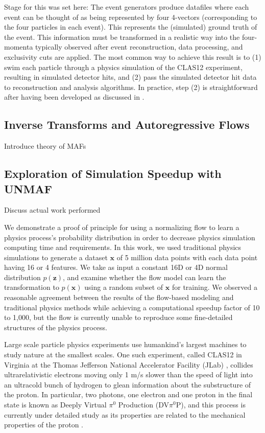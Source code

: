 
Stage for this was set here: The event generators produce datafiles where each event can be thought of as being represented by four 4-vectors (corresponding to the four particles in each event). This represents the (simulated) ground truth of the event. This information must be transformed in a realistic way into the four-momenta typically observed after event reconstruction, data processing, and exclusivity cuts are applied. The most common way to achieve this result is to (1) swim each particle through a physics simulation of the CLAS12 experiment, resulting in simulated detector hits, and (2) pass the simulated detector hit data to reconstruction and analysis algorithms. In practice, step (2) is straightforward after having been developed as discussed in .



\subsection{Inverse Transforms and Autoregressive Flows}
    Introduce theory of MAFs

\subsection{Exploration of Simulation Speedup with UNMAF}
    Discuss actual work performed

    

We demonstrate a proof of principle for using a normalizing flow to learn a physics process's probability distribution in order to decrease physics simulation computing time and requirements. In this work, we used traditional physics simulations to generate a dataset $\mathbf{x}$ of 5 million data points with each data point having 16 or 4 features.  We take as input a constant 16D or 4D normal distribution $p(\mathbf{z})$, and examine whether the flow model can learn the transformation to $p(\mathbf{x})$ using a random subset of $\mathbf{x}$ for training. We observed a reasonable agreement between the results of the flow-based modeling and traditional physics methods while achieving a computational speedup factor of 10 to 1,000, but the flow is currently unable to reproduce some fine-detailed structures of the physics process.



Large scale particle physics experiments use humankind's largest machines to study nature at the smallest scales. One such experiment, called CLAS12 in Virginia at the Thomas Jefferson National Accelerator Facility (JLab) \cite{Burkert2020TheLaboratory}, collides ultrarelativistic electrons moving only 1 m/s slower than the speed of light into an ultracold bunch of hydrogen to glean information about the substructure of the proton. In particular, two photons, one electron and one proton in the final state is known as Deeply Virtual $\pi^0$ Production (DV$\pi^0$P), and this process is currently under detailed study as its properties are related to the mechanical properties of the proton \cite{Ji1996DeeplyScattering}.

